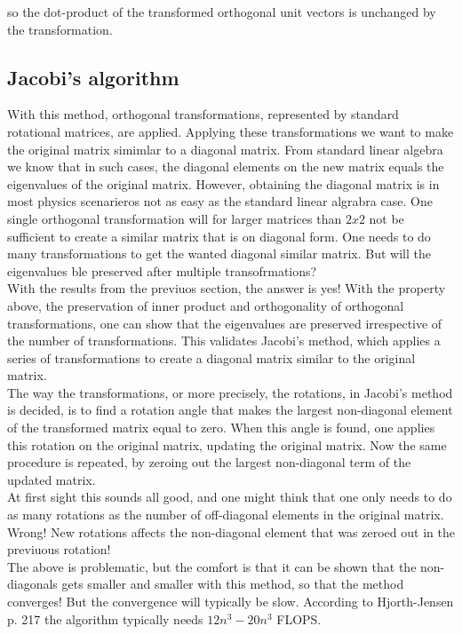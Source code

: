 \documentclass{article}
\begin{document}
so the dot-product of the transformed orthogonal unit vectors is unchanged by the transformation.

\subsection{Jacobi's algorithm}
With this method, orthogonal transformations, represented by standard rotational matrices, are applied. Applying these transformations we want to make the original matrix simimlar to a diagonal matrix. From standard linear algebra we know that in such cases, the diagonal elements on the new matrix equals the eigenvalues of the original matrix. However, obtaining the diagonal matrix is in most physics scenarieros not as easy as the standard linear algrabra case. One single orthogonal transformation will for larger matrices than $2x2$ not be sufficient to create a similar matrix that is on diagonal form. One needs to do many transformations to get the wanted diagonal similar matrix. But will the eigenvalues ble preserved after multiple transofrmations?\\

With the results from the previuos section, the answer is yes! With the property above, the preservation of inner product and orthogonality of orthogonal transformations, one can show that the eigenvalues are preserved irrespective of the number of transformations. This validates Jacobi's method, which applies a series of transformations to create a diagonal matrix similar to the original matrix.\\

The way the transformations, or more precisely, the rotations, in Jacobi's method is decided, is to find a rotation angle that makes the largest non-diagonal element of the transformed matrix equal to zero. When this angle is found, one applies this rotation on the original matrix, updating the original matrix. Now the same procedure is repeated, by zeroing out the largest non-diagonal term of the updated matrix.\\ 

At first sight this sounds all good, and one might think that one only needs to do as many rotations as the number of off-diagonal elements in the original matrix. Wrong! New rotations affects the non-diagonal element that was zeroed out in the previuous rotation!\\

The above is problematic, but the comfort is that it can be shown that the non-diagonals gets smaller and smaller with this method, so that the method converges! But the convergence will typically be slow. According to Hjorth-Jensen \cite{MHJ} p. 217 the algorithm typically needs $12n^3-20n^3$ FLOPS.\\
\end{document}
